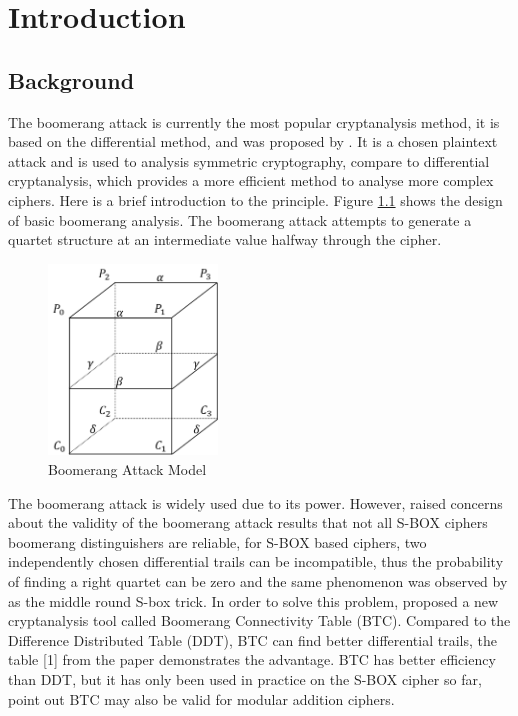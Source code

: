 \chapter{Introduction}\label{chap:intro}
\section{Background}
The boomerang attack is currently the most popular cryptanalysis method, it is based on the differential method, and was proposed by \cite{10.1007/3-540-48519-8_12}. It is a chosen plaintext attack and is used to analysis symmetric cryptography, compare to differential cryptanalysis, which provides a more efficient method to analyse more complex ciphers. Here is a brief introduction to the principle. Figure \ref{fig:boomerang} shows the design of basic boomerang analysis.  The boomerang attack attempts to generate a quartet structure at an intermediate value halfway through the cipher. 

\begin{figure}[hbt!]
    \centering
    \includegraphics[width=45mm]{boomerang}
    \caption[Boomerang Attack Model]{Boomerang Attack Model}\label{fig:boomerang}
\end{figure}

The boomerang attack is widely used due to its power. However, \cite{5730575} raised concerns about the validity of the boomerang attack results that not all S-BOX ciphers boomerang distinguishers are reliable, for S-BOX based ciphers, two independently chosen differential trails can be incompatible, thus the probability of finding a right quartet can be zero and the same phenomenon was observed by \cite{10.1007/978-3-540-45146-4_12} as the middle round S-box trick. In order to solve this problem, \cite{10.1007/978-3-319-78375-8_22} proposed a new cryptanalysis tool called Boomerang Connectivity Table (BTC). Compared to the Difference Distributed Table (DDT), BTC can find better differential trails, the table [1] from the paper demonstrates the advantage. BTC has better efficiency than DDT, but it has only been used in practice on the S-BOX cipher so far, \cite{10.1007/978-3-319-78375-8_22} point out BTC may also be valid for modular addition ciphers.

